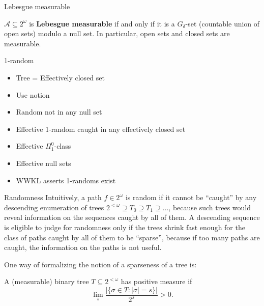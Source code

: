\begin{frame}{Lebesgue measurable}
  \begin{fact*}
    $\mathcal{A}\subseteq2^\omega$ is \textbf{Lebesgue measurable} if and
    only if it is a $G_\delta$-set (countable union of open sets) modulo a
    null set. In particular, open sets and closed sets are measurable.
  \end{fact*}

  \begin{define*}
    1-random
  \end{define*}

  \begin{itemize}
    \item Tree = Effectively closed set
    \item Use notion
    \item Random not in any null set
    \item Effective 1-random caught in any effectively closed set
    \item Effective $\Pi_1^0$-class
    \item Effective null sets
    \item WWKL asserts 1-randoms exist
  \end{itemize}
\end{frame}

\begin{frame}{Randomness}
  Intuitively, a path $f\in2^\omega$ is random if it cannot be ``caught''
  by any descending enumeration of trees $2^{<\omega}\supseteq T_0\supseteq
  T_1\supseteq \ldots$, because such trees would reveal information on the
  sequences caught by all of them. A descending sequence is eligible to judge
  for randomness only if the trees shrink fast enough for the class of paths
  caught by all of them to be ``sparse'', because if too many paths are
  caught, the information on the paths is not useful.

  \vspace{1em}
  One way of formalizing the notion of a sparseness of a tree is:
  \begin{define*}
    A (measurable) binary tree $T\subseteq2^{<\omega}$ has positive measure
    if
    \[\lim_s \frac{|\{\sigma\in T: |\sigma|=s\}|}{2^s} >0.\]
  \end{define*}
\end{frame}

